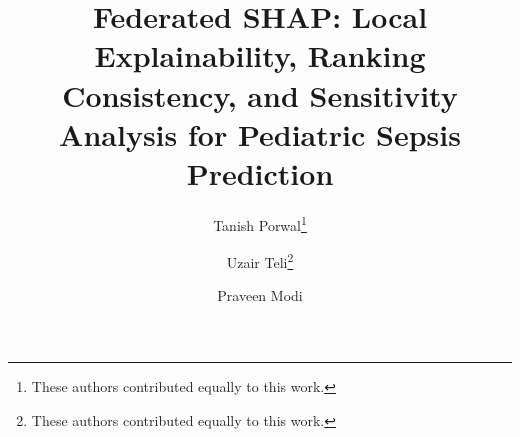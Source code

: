 \documentclass[runningheads]{llncs}
\begin{document}
\title{Federated SHAP: Local Explainability, Ranking Consistency, and Sensitivity Analysis for Pediatric Sepsis Prediction}


\author{Tanish Porwal\thanks{These authors contributed equally to this work.} \and
Uzair Teli\fnmsep\thanks{These authors contributed equally to this work.} \and
Praveen Modi}



\maketitle
\end{document}
